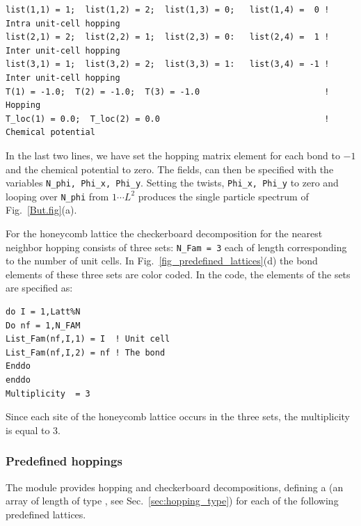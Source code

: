 \begin{lstlisting}[style=fortran]
list(1,1) = 1;  list(1,2) = 2;  list(1,3) = 0;   list(1,4) =  0 ! Intra unit-cell hopping
list(2,1) = 2;  list(2,2) = 1;  list(2,3) = 0:   list(2,4) =  1 ! Inter unit-cell hopping
list(3,1) = 1;  list(3,2) = 2;  list(3,3) = 1:   list(3,4) = -1 ! Inter unit-cell hopping
T(1) = -1.0;  T(2) = -1.0;  T(3) = -1.0                         ! Hopping
T_loc(1) = 0.0;  T_loc(2) = 0.0                                 ! Chemical potential 
\end{lstlisting} 
In the last two lines, we have set the hopping matrix element  for each bond to $-1$  and the chemical potential to zero.    The fields,   can then be specified   with the  variables   \texttt{N\_phi, Phi\_x, Phi\_y}.  Setting   the twists, 
\texttt{Phi\_x, Phi\_y}  to zero and  looping over \texttt{N\_phi}    from $ 1 \cdots L^2 $   produces  the single particle spectrum of  Fig.~\ref{But.fig}(a).  

For the honeycomb lattice  the checkerboard decomposition  for the nearest neighbor hopping consists of three  sets:  \texttt{N\_Fam = 3}  each of length   corresponding  to the number of unit cells.  In  Fig.~\ref{fig_predefined_lattices}(d)  
the bond elements of these three sets are color coded. In the code, the elements of the sets are specified as:

\begin{lstlisting}[style=fortran] 
do I = 1,Latt%N
Do nf = 1,N_FAM
List_Fam(nf,I,1) = I  ! Unit cell
List_Fam(nf,I,2) = nf ! The bond 
Enddo
enddo
Multiplicity  = 3
\end{lstlisting}        
Since each site of the honeycomb lattice occurs in  the three sets,  the multiplicity is equal to 3.  


\subsubsection{Predefined hoppings}

The  module provides hopping and checkerboard decompositions, defining a   (an array of length  of type  , see Sec.~\ref{sec:hopping_type}) for each of the following predefined lattices.

